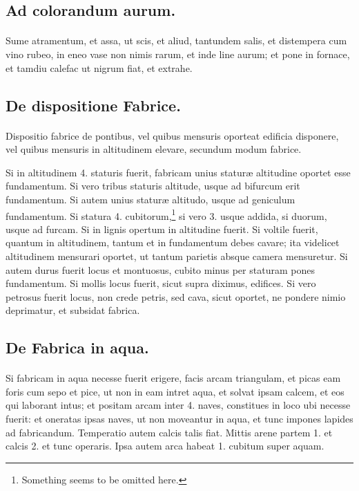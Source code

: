\documentclass[a4paper, 11pt, oneside, polutonikogreek, italian]{article}
\begin{document}
\subsection{Ad colorandum aurum.}
\paragraph{}
Sume atramentum, et assa, ut scis, et aliud, tantundem salis, et distempera cum vino rubeo, in eneo vase non nimis rarum, et inde line aurum; et pone in fornace, et tamdiu calefac ut nigrum fiat, et extrahe.

\subsection{De dispositione Fabrice.}
\paragraph{}
Dispositio fabrice de pontibus, vel quibus mensuris oporteat edificia disponere, vel quibus mensuris in altitudinem elevare, secundum modum fabrice.

Si in altitudinem 4. staturis fuerit, fabricam unius staturæ altitudine oportet esse fundamentum. Si vero tribus staturis altitude, usque ad bifurcum erit fundamentum. Si autem unius staturæ altitudo, usque ad geniculum fundamentum. Si statura 4. cubitorum,\footnote{Something seems to be omitted here.} si vero 3. usque addida, si duorum, usque ad furcam. Si in lignis opertum in altitudine fuerit. Si voltile fuerit, quantum in altitudinem, tantum et in fundamentum debes cavare; ita videlicet altitudinem mensurari oportet, ut tantum parietis absque camera mensuretur. Si autem durus fuerit locus et montuosus, cubito minus per staturam pones fundamentum. Si mollis locus fuerit, sicut supra diximus, edifices. Si vero petrosus fuerit locus, non crede petris, sed cava, sicut oportet, ne pondere nimio deprimatur, et subsidat fabrica.

\subsection{De Fabrica in aqua.}
\paragraph{}
Si fabricam in aqua necesse fuerit erigere, facis arcam triangulam, et picas eam foris cum sepo et pice, ut non in eam intret aqua, et solvat ipsam calcem, et eos qui laborant intus; et positam arcam inter 4. naves, constitues in loco ubi necesse fuerit: et oneratas ipsas naves, ut non moveantur in aqua, et tunc impones lapides ad fabricandum. Temperatio autem calcis talis fiat. Mittis arene partem 1. et calcis 2. et tunc operaris. Ipsa autem arca habeat 1. cubitum super aquam.
\end{document}
